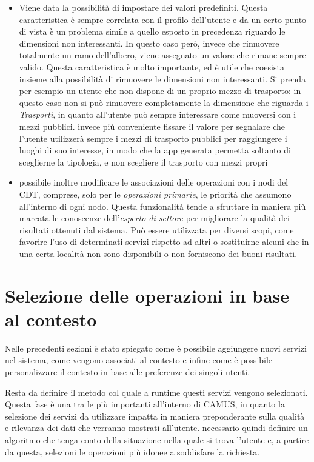 \begin{itemize}
	\item Viene data la possibilità di impostare dei valori predefiniti. Questa caratteristica è sempre correlata con il profilo dell'utente e da un certo punto di vista è un problema simile a quello esposto in precedenza riguardo le dimensioni non interessanti. In questo caso però, invece che rimuovere totalmente un ramo dell'albero, viene assegnato un valore che rimane sempre valido. Questa caratteristica è molto importante, ed è utile che coesista insieme alla possibilità di rimuovere le dimensioni non interessanti. Si prenda per esempio un utente che non dispone di un proprio mezzo di trasporto: in questo caso non si può rimuovere completamente la dimensione che riguarda i \emph{Trasporti}, in quanto all'utente può sempre interessare come muoversi con i mezzi pubblici. \upe invece più conveniente fissare il valore  per segnalare che l'utente utilizzerà sempre i mezzi di trasporto pubblici per raggiungere i luoghi di suo interesse, in modo che la app generata permetta soltanto di sceglierne la tipologia, e non scegliere il trasporto con mezzi propri
	\item \upe possibile inoltre modificare le associazioni delle operazioni con i nodi del CDT, comprese, solo per le \emph{operazioni primarie}, le priorità che assumono all'interno di ogni nodo. Questa funzionalità tende a sfruttare in maniera più marcata le conoscenze dell'\emph{esperto di settore} per migliorare la qualità dei risultati ottenuti dal sistema. Può essere utilizzata per diversi scopi, come favorire l'uso di determinati servizi rispetto ad altri o sostituirne alcuni che in una certa località non sono disponibili o non forniscono dei buoni risultati.
\end{itemize}

\section{Selezione delle operazioni in base al contesto\label{sec:selezione-operazioni}}

Nelle precedenti sezioni è stato spiegato come è possibile aggiungere nuovi servizi nel sistema, come vengono associati al contesto e infine come è possibile personalizzare il contesto in base alle preferenze dei singoli utenti.

Resta da definire il metodo col quale a runtime questi servizi vengono selezionati. Questa fase è una tra le più importanti all'interno di CAMUS, in quanto la selezione dei servizi da utilizzare impatta in maniera preponderante sulla qualità e rilevanza dei dati che verranno mostrati all'utente. \upe necessario quindi definire un algoritmo che tenga conto della situazione nella quale si trova l'utente e, a partire da questa, selezioni le operazioni più idonee a soddisfare la richiesta. 

